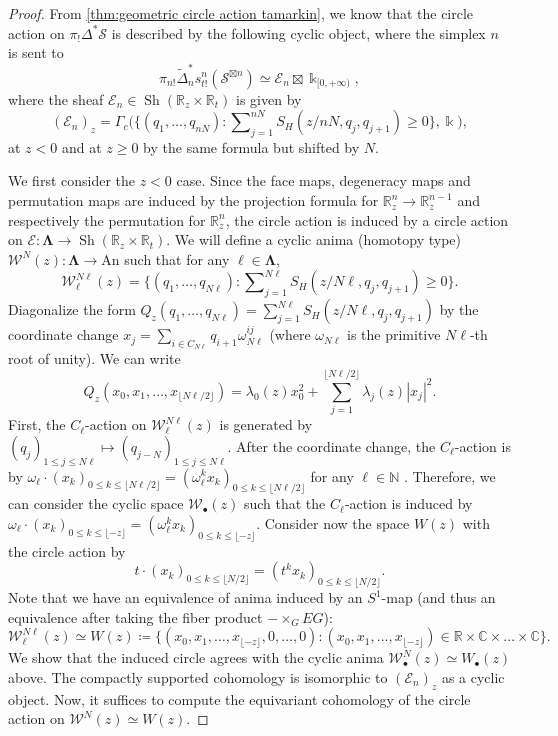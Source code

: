 \documentclass[11pt]{amsart}
\numberwithin{equation}{section}
\theoremstyle{plain}
\theoremstyle{definition}
\theoremstyle{remark}
\newcommand{\bC} { {\mathbb{C}}}
\newcommand{\bR} { {\mathbb{R}}}
\newcommand{\bN} { {\mathbb{N}}}
\newcommand{\cE} { {\mathcal{E}}}
\newcommand{\Sh} { {\operatorname{Sh}}}
\begin{document}
\begin{proof}
From \autoref{thm:geometric circle action tamarkin}, we know that the circle action on $\pi_!\Delta^*\mathcal{S}$ is described by the following cyclic object, where the simplex $n$ is sent to
\[\pi_{n!}\widetilde{\Delta}_n^*s_{t!}^n(\mathcal{S}^{\boxtimes n}) \simeq \cE_n \boxtimes \Bbbk_{[0,+\infty)},\]
where the sheaf $\cE_n \in \Sh(\bR_z \times \bR_t)$ is given by
\[(\cE_n)_{z} = \Gamma_c\Big(\Big\{(q_1, \dots, q_{nN}):  \sum\nolimits_{j=1}^{nN}S_H(z/nN, q_j, q_{j+1}) \geq 0\Big\}, \Bbbk \Big),\]
at $z<0$ and at $z\geq 0$ by the same formula but shifted by $N$.

We first consider the $z<0$ case. Since the face maps, degeneracy maps and permutation maps are induced by the projection formula for $\bR_z^n \to \bR^{n-1}_z$ and respectively the permutation for $\bR^n_z$, the circle action is induced by a circle action on $\cE: \boldsymbol{\Lambda} \to \Sh(\bR_z \times \bR_t)$. We will define a cyclic anima (homotopy type) $\mathcal{W}^N(z): \boldsymbol{\Lambda} \to \mathrm{An}$ such that for any $\ell \in \boldsymbol{\Lambda}$,
\[\mathcal{W}^{N\ell}_\ell(z) = \Big\{(q_1, \dots, q_{N\ell}): \sum\nolimits_{j=1}^{N\ell}S_H(z/N\ell, q_j, q_{j+1}) \geq 0\Big\}.\]
Diagonalize the form $Q_z(q_1, \dots, q_{N\ell}) = \sum_{j=1}^{N\ell}S_H(z/N\ell, q_j, q_{j+1})$ by the coordinate change $x_j = \sum_{i \in C_{N\ell}}q_{i+1}\omega^{ij}_{N\ell}$ (where $\omega_{N\ell}$ is the primitive $N\ell$-th root of unity). We can write
\[Q_z(x_0,x_1, \dots, x_{\lfloor N\ell/2\rfloor}) = \lambda_0(z)x_0^2 + \sum_{j=1}^{\lfloor N\ell/2\rfloor}\lambda_j(z)|x_j|^2.\]
First, the $C_\ell$-action on $\mathcal{W}_\ell^{N\ell}(z)$ is generated by $(q_j)_{1\leq j\leq N\ell} \mapsto (q_{j-N})_{1\leq j\leq N\ell}$. After the coordinate change, the $C_\ell$-action is by $\omega_\ell \cdot (x_k)_{0\leq k \leq \lfloor N\ell/2\rfloor} = (\omega_\ell^kx_k)_{0\leq k \leq \lfloor N\ell/2\rfloor}$ for any $\ell \in \bN$ \cite[Equation (3.20)]{Capacities2021} \cite[Equation (4.20)]{zhangthesis}. 
Therefore, we can consider the cyclic space $\mathcal W_\bullet(z)$ such that the $C_\ell$-action is induced by $\omega_\ell \cdot (x_k)_{0\leq k\leq \lfloor -z\rfloor} = (\omega_\ell^k x_k)_{0\leq k\leq \lfloor -z\rfloor}$. Consider now the space $W(z)$ with the circle action by 
\[t \cdot (x_k)_{0\leq k \leq \lfloor N/2\rfloor} = (t^kx_k)_{0\leq k \leq \lfloor N/2\rfloor}. \]
Note that we have an equivalence of anima induced by an $S^1$-map (and thus an equivalence after taking the fiber product $- \times_G EG$):
\[\mathcal{W}_{\ell}^{N\ell}(z) \simeq W(z) \coloneqq \{(x_0, x_1,\dots, x_{\lfloor -z\rfloor}, 0, \dots, 0): (x_0, x_1,\dots, x_{\lfloor -z\rfloor}) \in \bR \times \bC \times \dots \times \bC\}.\]
We show that the induced circle agrees with the cyclic anima $\mathcal{W}^N_\bullet(z) \simeq W_\bullet (z)$ above.
The compactly supported cohomology is isomorphic to $(\cE_n)_{z}$ as a cyclic object. Now, it suffices to compute the equivariant cohomology of the circle action on $\mathcal{W}^N(z) \simeq W(z)$.


\end{proof}
\end{document}
